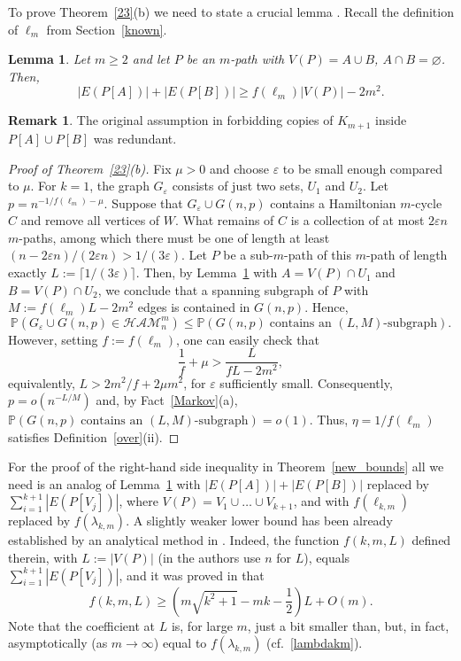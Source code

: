 \documentclass[reqno, 12pt]{amsart}
\numberwithin{equation}{section}
\numberwithin{figure}{section}
\let\emptyset=\varnothing
\let\epsilon=\varepsilon
\let\eps=\epsilon
\def\PP{{\mathds P}}
\let\Prob=\PP
\newcommand{\ham}{\mathcal{HAM}}
\theoremstyle{plain}
\newtheorem{lemma}[thm]{Lemma}
\theoremstyle{definition}
\newtheorem{rem}[thm]{Remark}
\begin{document}
To prove Theorem~\ref{23}(b) we need to state a crucial lemma \cite[Lemma 2.2]{ADR}. Recall the definition of $\ell_m$ from Section~\ref{known}.

\begin{lemma}\label{lem:pathedges}
 Let $m\geq 2$ and let $P$ be an $m$-path with $V(P)=A\cup B$, $A\cap B=\emptyset$. Then,
\[|E(P[A])| + |E(P[B])| \geq f(\ell_m)|V(P)| -2m^2.\]
\end{lemma}

\begin{rem} The original assumption in \cite[Lemma 2.2]{ADR} forbidding copies of $K_{m+1}$ inside $P[A]\cup P[B]$ was redundant. \end{rem}

\begin{proof}[Proof of Theorem~\ref{23}(b)] Fix $\mu>0$ and choose $\eps$ to be small enough compared to $\mu$.
For $k=1$, the graph $G_\eps$ consists of just two sets, $U_1$ and $U_2$. Let $p=n^{-1/f(\ell_m)-\mu}$. Suppose that $G_\eps\cup G(n,p)$ contains a Hamiltonian $m$-cycle $C$ and remove all vertices of $W$. What remains of $C$ is a collection of at most $2\eps n$ $m$-paths, among which there must be one of length at least $(n-2\eps n)/(2\eps n)>1/(3\eps)$. Let $P$ be a sub-$m$-path of this $m$-path of length exactly $L:=\lceil 1/(3\eps)\rceil$. Then, by Lemma~\ref{lem:pathedges} with $A=V(P)\cap U_1$ and $B=V(P)\cap U_2$, we conclude that a spanning subgraph of $P$ with $M:=f(\ell_m)L -2m^2$ edges is contained in $G(n,p)$. Hence,
$$\Prob(G_\eps\cup G(n,p)\in\ham^m_n)\le\Prob(G(n,p)\;\mbox{contains an $(L,M)$-subgraph}).$$
However, setting $f:=f(\ell_m)$, one can easily check that
$$\frac1f+\mu>\frac{L}{fL-2m^2},$$
equivalently, $L>2m^2/f+2\mu m^2$, for $\eps$ sufficiently small. Consequently, $p=o(n^{-L/M})$ and, by Fact~\ref{Markov}(a), $\Prob(G(n,p)\;\mbox{contains an $(L,M)$-subgraph})=o(1)$.
Thus, $\eta=1/f(\ell_m)$ satisfies Definition~\ref{over}(ii).
\end{proof}

For the proof of the right-hand side inequality in Theorem~\ref{new_bounds} all we need is an analog of Lemma~\ref{lem:pathedges} with $|E(P[A])| + |E(P[B])|$ replaced by $\sum_{i=1}^{k+1}|E(P[V_{j}])|$, where $V(P)=V_1\cup\dots\cup V_{k+1}$, and
 with $f(\ell_{k,m})$ replaced by $f(\lambda_{k,m})$. A slightly weaker lower bound has been already established by an analytical method  in \cite[Section 4]{AR}. Indeed, the function $f(k,m,L)$ defined therein, with $L:=|V(P)|$ (in \cite{AR} the authors use $n$ for $L$), equals $\sum_{i=1}^{k+1}|E(P[V_{j}])|$, and it was proved in \cite[Theorem 4.1]{AR} that
 $$f(k,m,L)\ge\left(m\sqrt{k^2+1}-mk-\frac12\right)L+O(m).$$ 
 Note that the coefficient at $L$ is, for large $m$, just a bit smaller than, but, in fact, asymptotically (as $m\to\infty$) equal to $f(\lambda_{k,m})$ (cf.~\eqref{lambdakm}).
\end{document}
